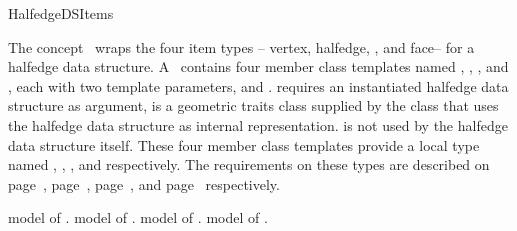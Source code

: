
\ccRefPageBegin



\begin{ccRefConcept}{HalfedgeDSItems}

\ccDefinition
  
The concept \ccRefName\ wraps the four item types -- vertex,
halfedge, {\XHDS {}}, and face-- for a halfedge data structure.
A \ccRefName\ contains four member class templates named ,
, {\XHDS {}},
and , each with two template parameters,  and .
 requires an
instantiated halfedge data structure  as argument,
 is a geometric traits class supplied by the class that
uses the halfedge data structure as internal representation. 
is not used by the halfedge data structure itself. These four member 
class templates provide a local type named , ,
{\XHDS {}}, and  respectively.
The requirements on these
types are described on page~\pageref{pageHalfedgeDSItemsVertexRef},
page~\pageref{pageHalfedgeDSItemsHalfedgeRef}, 
page~\pageref{pageHalfedgeDSItemsHalfedgeCycleRef}, 
and page~\pageref{pageHalfedgeDSItemsFaceRef} respectively.

\ccTypes
{}

    {model of .}
\ccGlue
{}
    {model of .}
\ccGlue
{}
    {model of .}
\ccGlue
{}
    {\XHDS model of .}

\ccHasModels

\\
\\


\end{ccRefConcept}
